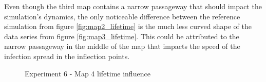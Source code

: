 Even though the third map contains a narrow passageway that should impact the simulation's dynamics, the only noticeable difference between the reference simulation from figure \ref{fig:map2_lifetime} is the much less curved shape of the data series from figure \ref{fig:map3_lifetime}.
This could be attributed to the narrow passageway in the middle of the map that impacts the speed of the infection spread in the inflection points.

\begin{figure}[H]
    \centering

    \hspace*{\fill}

    \hspace*{\fill}

    \caption{Experiment 6 - Map 4 lifetime influence}\label{fig:map4_lifetime}
\end{figure}

